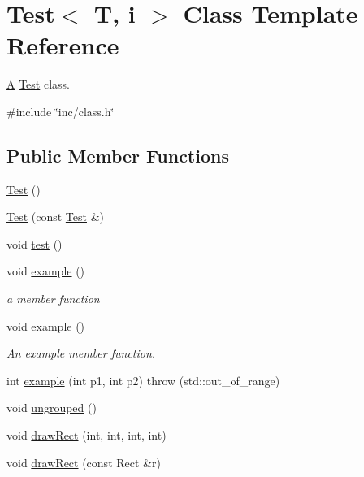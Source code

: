 \hypertarget{class_test}{}\section{Test$<$ T, i $>$ Class Template Reference}
\label{class_test}


\mbox{\hyperlink{class_a}{A}} \mbox{\hyperlink{class_test}{Test}} class.  




{\ttfamily \#include \char`\"{}inc/class.\+h\char`\"{}}

\subsection*{Public Member Functions}
\begin{DoxyCompactItemize}
\item 
\mbox{\hyperlink{class_test_a44e3a28c552193de099601e2910531f1}{Test}} ()
\item 
\mbox{\hyperlink{class_test_adcf1bc755df94c4d07519c0a02aa1cc0}{Test}} (const \mbox{\hyperlink{class_test}{Test}} \&)
\item 
void \mbox{\hyperlink{class_test_a4cb7b5dcc0c62cea42975109dcd9208b}{test}} ()
\item 
\mbox{\label{class_test_a219565a812ad07b6517d74bdb36711ea}} 
void \mbox{\hyperlink{class_test_a219565a812ad07b6517d74bdb36711ea}{example}} ()
\begin{DoxyCompactList}\small\item\em a member function \end{DoxyCompactList}\item 
void \mbox{\hyperlink{class_test_a219565a812ad07b6517d74bdb36711ea}{example}} ()
\begin{DoxyCompactList}\small\item\em An example member function. \end{DoxyCompactList}\item 
int \mbox{\hyperlink{class_test_a741b152810e5bab756cc06c9ded78f5f}{example}} (int p1, int p2)  throw (std\+::out\+\_\+of\+\_\+range)
\item 
void \mbox{\hyperlink{class_test_a2671fd85c5d94331067a9175ed326479}{ungrouped}} ()
\item 
void \mbox{\hyperlink{class_test_a6b16f6be500388342845646c1969d3aa}{draw\+Rect}} (int, int, int, int)
\item 
void \mbox{\hyperlink{class_test_aadf47113ad9dcd5600cb22e3bcff5258}{draw\+Rect}} (const Rect \&r)

\end{DoxyCompactItemize}
